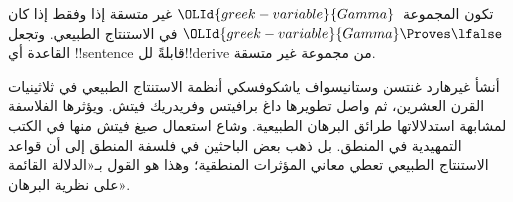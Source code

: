 \documentclass[../../../include/open-logic-section]{subfiles}
\begin{document}
تكون المجموعة~$\OLId{greek-variable}{Gamma}$ غير متسقة إذا وفقط إذا كان
$\OLId{greek-variable}{Gamma} \Proves \lfalse$ في الاستنتاج الطبيعي. وتجعل القاعدة
\FalseInt{} أي !!{sentence} قابلةً لل!!{derive} من مجموعة غير
متسقة.

أنشأ غيرهارد غنتسن وستانيسواف ياشكوفسكي أنظمة الاستنتاج الطبيعي في ثلاثينيات القرن العشرين، ثم واصل تطويرها داغ برافيتس وفريدريك فيتش.
ويؤثرها الفلاسفة لمشابهة استدلالاتها طرائق البرهان الطبيعية. وشاع استعمال صيغ فيتش منها في الكتب التمهيدية في المنطق.
بل ذهب بعض الباحثين في فلسفة المنطق إلى أن قواعد الاستنتاج الطبيعي تعطي معاني المؤثرات المنطقية؛ وهذا هو القول بـ«الدلالة القائمة على نظرية البرهان».
\end{document}
